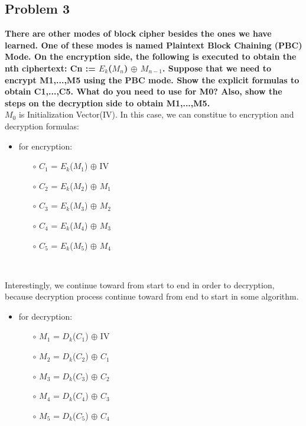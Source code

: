 \documentclass[11pt]{article}
\begin{document}
\subsection{Problem 3}
\textbf{There are other modes of block cipher besides the ones we have learned. One of these modes
is named Plaintext Block Chaining (PBC) Mode. On the encryption side, the following is
executed to obtain the nth ciphertext: Cn := $E_{k}$($M_{n}$) $\oplus$  $M_{n-1}$. Suppose that we need to
encrypt M1,...,M5 using the PBC mode. Show the explicit formulas to obtain C1,...,C5.
What do you need to use for M0? Also, show the steps on the decryption side to obtain
M1,...,M5.}\\

$M_{0}$ is Initialization Vector(IV). In this case, we can constitue to encryption and decryption formulas: \\

  \begin{itemize}
    \item for encryption:
    \begin{itemize}
      \item[$\circ$] $C_{1}$ = $E_{k}$($M_{1}$) $\oplus$ IV
      \item[$\circ$] $C_{2}$ = $E_{k}$($M_{2}$) $\oplus$ $M_{1}$
      \item[$\circ$] $C_{3}$ = $E_{k}$($M_{3}$) $\oplus$ $M_{2}$
      \item[$\circ$] $C_{4}$ = $E_{k}$($M_{4}$) $\oplus$ $M_{3}$
      \item[$\circ$] $C_{5}$ = $E_{k}$($M_{5}$) $\oplus$ $M_{4}$
    \end{itemize}\
  \end{itemize}

Interestingly, we  continue toward  from start to end in order to decryption, because decryption process continue toward 
from end to start in some algorithm.

\newpage\begin{itemize}
  \item for decryption:
  \begin{itemize}
    \item[$\circ$] $M_{1}$ = $D_{k}$($C_{1}$) $\oplus$ IV
    \item[$\circ$] $M_{2}$ = $D_{k}$($C_{2}$) $\oplus$ $C_{1}$
    \item[$\circ$] $M_{3}$ = $D_{k}$($C_{3}$) $\oplus$ $C_{2}$
    \item[$\circ$] $M_{4}$ = $D_{k}$($C_{4}$) $\oplus$ $C_{3}$
    \item[$\circ$] $M_{5}$ = $D_{k}$($C_{5}$) $\oplus$ $C_{4}$
  \end{itemize}
\end{itemize}
\end{document}
